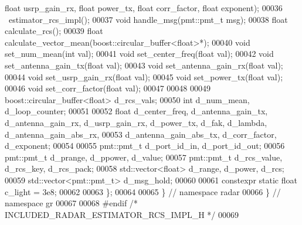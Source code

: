 \begin{DoxyCode}
{      float} usrp\_gain\_rx, \textcolor{keywordtype}{float} power\_tx, \textcolor{keywordtype}{float} corr\_factor, \textcolor{keywordtype}{float} exponent);
00036       ~estimator_rcs_impl();
00037       \textcolor{keywordtype}{void} handle_msg(pmt::pmt\_t msg);
00038       \textcolor{keywordtype}{float} calculate_rcs();
00039       \textcolor{keywordtype}{float} calculate_vector_mean(boost::circular\_buffer<float>*);
00040       \textcolor{keywordtype}{void} set_num_mean(\textcolor{keywordtype}{int} val);
00041       \textcolor{keywordtype}{void} set_center_freq(\textcolor{keywordtype}{float} val);
00042       \textcolor{keywordtype}{void} set_antenna_gain_tx(\textcolor{keywordtype}{float} val);
00043       \textcolor{keywordtype}{void} set_antenna_gain_rx(\textcolor{keywordtype}{float} val);
00044       \textcolor{keywordtype}{void} set_usrp_gain_rx(\textcolor{keywordtype}{float} val);
00045       \textcolor{keywordtype}{void} set_power_tx(\textcolor{keywordtype}{float} val);
00046       \textcolor{keywordtype}{void} set_corr_factor(\textcolor{keywordtype}{float} val);
00047 
00048 
00049       boost::circular\_buffer<float> d_rcs_vals;
00050       \textcolor{keywordtype}{int} d_num_mean, d_loop_counter;
00051 
00052       \textcolor{keywordtype}{float} d_center_freq, d_antenna_gain_tx, d_antenna_gain_rx, d_usrp_gain_rx, 
      d_power_tx, d_fak, d_lambda, d_antenna_gain_abs_rx,
00053         d_antenna_gain_abs_tx, d_corr_factor, d_exponent;
00054 
00055       pmt::pmt\_t d_port_id_in, d_port_id_out;
00056       pmt::pmt\_t d_prange, d_ppower, d_value;
00057       pmt::pmt\_t d_rcs_value, d_rcs_key, d_rcs_pack;
00058       std::vector<float> d_range, d_power, d_rcs;
00059       std::vector<pmt::pmt\_t> d_msg_hold;
00060 
00061       constexpr \textcolor{keyword}{static} \textcolor{keywordtype}{float} c_light = 3e8;
00062 
00063     \};
00064 
00065   \} \textcolor{comment}{// namespace radar}
00066 \} \textcolor{comment}{// namespace gr}
00067 
00068 \textcolor{preprocessor}{#endif }\textcolor{comment}{/* INCLUDED\_RADAR\_ESTIMATOR\_RCS\_IMPL\_H */}\textcolor{preprocessor}{}
00069 
\end{DoxyCode}
